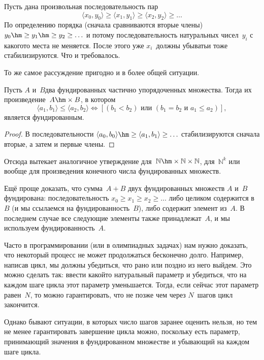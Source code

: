 Пусть дана произвольная последовательность пар
        $$
\langle x_0, y_0 \rangle \ge
\langle x_1, y_1 \rangle \ge
\langle x_2, y_2 \rangle \ge \dots
        $$
По определению порядка (сначала сравниваются вторые члены)
$y_0\hm\ge y_1\hm\ge y_2\ge\ldots$ и потому последовательность
натуральных чисел~$y_i$
с какого\д то места не меняется. После этого уже $x_i$~должны
убывать\т и тоже стабилизируются. Что и требовалось.

То же самое рассуждение пригодно и в более общей ситуации.
\begin{theorem}
Пусть $A$ и~$B$\т два фундированных частично упорядоченных
множества. Тогда их произведение~$A\hm\times B$, в котором
        $$
\langle a_1, b_1 \rangle \le
\langle a_2, b_2 \rangle \Leftrightarrow
[(b_1 < b_2) \text{ или } (b_1=b_2 \text{ и } a_1\le a_2)],
        $$
является фундированным.
\end{theorem}

\begin{proof}
В последовательности
$\langle a_0,b_0 \rangle \hm\ge
 \langle a_1,b_1 \rangle \ge\ldots$ стабилизируются сначала
вторые, а затем и первые члены.
\end{proof}

Отсюда вытекает аналогичное утверждение
для~$\mathbb{N}\hm\times\mathbb{N}\times\mathbb{N}$, для~$\mathbb{N}^k$
или вообще для произведения конечного числа фундированных
множеств.

Ещё проще доказать, что сумма~$A+B$ двух фундированных множеств
$A$ и~$B$ фундирована: последовательность $x_0\ge x_1\ge
x_2\ge\dots$ либо целиком содержится в~$B$ (и мы ссылаемся на
фундированность~$B$), либо содержит элемент из~$A$. В последнем
случае все следующие элементы также принадлежат~$A$, и мы
используем фундированность~$A$.

\smallskip

Часто в программировании (или в олимпиадных задачах) нам нужно
доказать, что некоторый процесс не может продолжаться бесконечно
долго. Например, написав цикл, мы должны убедиться, что рано или
поздно из него выйдем. Это можно сделать так: ввести какой\д то
натуральный параметр и убедиться, что на каждом шаге цикла этот
параметр уменьшается. Тогда, если сейчас этот параметр равен~$N$,
то можно гарантировать, что не позже чем через $N$~шагов
цикл закончится.

Однако бывают ситуации, в которых число шагов заранее оценить
нельзя, но тем не менее гарантировать завершение цикла можно,
поскольку есть параметр, принимающий значения в фундированном
множестве и убывающий на каждом шаге цикла.

